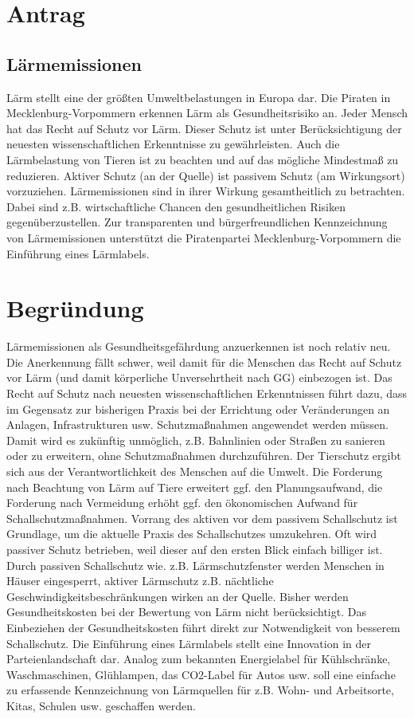 \section{Antrag}

\subsection{Lärmemissionen}

Lärm stellt eine der größten Umweltbelastungen in Europa dar. Die Piraten in Mecklenburg-Vorpommern erkennen Lärm als Gesundheitsrisiko an. Jeder Mensch hat das Recht auf Schutz vor Lärm. Dieser Schutz ist unter Berücksichtigung der neuesten wissenschaftlichen Erkenntnisse zu gewährleisten. Auch die Lärmbelastung von Tieren ist zu beachten und auf das mögliche Mindestmaß zu reduzieren. Aktiver Schutz (an der Quelle) ist passivem Schutz (am Wirkungsort) vorzuziehen. Lärmemissionen sind in ihrer Wirkung gesamtheitlich zu betrachten. Dabei sind z.B. wirtschaftliche Chancen den gesundheitlichen Risiken gegenüberzustellen. Zur transparenten und bürgerfreundlichen Kennzeichnung von Lärmemissionen unterstützt die Piratenpartei Mecklenburg-Vorpommern die Einführung eines Lärmlabels.

\section{Begründung}

Lärmemissionen als Gesundheitsgefährdung anzuerkennen ist noch relativ neu. Die Anerkennung fällt schwer, weil damit für die Menschen das Recht auf Schutz vor Lärm (und damit körperliche Unversehrtheit nach GG) einbezogen ist. Das Recht auf Schutz nach neuesten wissenschaftlichen Erkenntnissen führt dazu, dass im Gegensatz zur bisherigen Praxis bei der Errichtung oder Veränderungen an Anlagen, Infrastrukturen usw. Schutzmaßnahmen angewendet werden müssen. Damit wird es zukünftig unmöglich, z.B. Bahnlinien oder Straßen zu sanieren oder zu erweitern, ohne Schutzmaßnahmen durchzuführen. Der Tierschutz ergibt sich aus der Verantwortlichkeit des Menschen auf die Umwelt. Die Forderung nach Beachtung von Lärm auf Tiere erweitert ggf. den Planungsaufwand, die Forderung nach Vermeidung erhöht ggf. den ökonomischen Aufwand für Schallschutzmaßnahmen. Vorrang des aktiven vor dem passivem Schallschutz ist Grundlage, um die aktuelle Praxis des Schallschutzes umzukehren. Oft wird passiver Schutz betrieben, weil dieser auf den ersten Blick einfach billiger ist. Durch passiven Schallschutz wie. z.B. Lärmschutzfenster werden Menschen in Häuser eingesperrt, aktiver Lärmschutz z.B. nächtliche Geschwindigkeitsbeschränkungen wirken an der Quelle. Bisher werden Gesundheitskosten bei der Bewertung von Lärm nicht berücksichtigt. Das Einbeziehen der Gesundheitskosten führt direkt zur Notwendigkeit von besserem Schallschutz. Die Einführung eines Lärmlabels stellt eine Innovation in der Parteienlandschaft dar. Analog zum bekannten Energielabel für Kühlschränke, Waschmaschinen, Glühlampen, das CO2-Label für Autos usw. soll eine einfache zu erfassende Kennzeichnung von Lärmquellen für z.B. Wohn- und Arbeitsorte, Kitas, Schulen usw. geschaffen werden.

